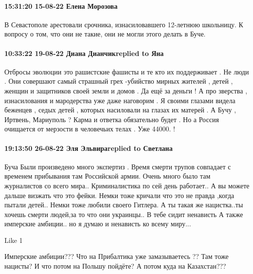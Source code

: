  
 
 
 
 

\paragraph{15:31:20 15-08-22 Елена Морозова}

В Севастополе арестовали срочника, изнасиловавшего 12-летнюю школьницу.
К вопросу о том, что они не такие, они не могли этого делать в Буче.

\paragraph{10:33:22 19-08-22 Диана Дианчикreplied to Яна}

Отбросы эволюции это рашистские фашисты и те кто их поддерживает . Не люди .
Они совершают самый страшный грех -убийство мирных жителей , детей , женщин и
защитников своей земли и домов . Да ещё за деньги ! А про зверства ,
изнасилования и мародерства уже даже наговорим . Я своими глазами видела
беженцев , седых детей , которых насиловали на глазах их матерей . А Бучу ,
Иртвень, Мариуполь ? Карма и ответка обязательно будет . Но а Россия очищается
от мерзости в человечьих телах . Уже 44000. !

\paragraph{19:13:50 26-08-22 Эля Эльвираreplied to Светлана}

Буча
Были произведено много экспертиз .
Время смерти трупов совпадает с временем прибывания там Российской армии.
Очень много было там журналистов со всего мира..
Криминалистика по сей день работает..
А вы можете дальше визжать что это фейки.
Немки тоже кричали что это не правда ,когда пытали детей..
Немки тоже любили своего Гитлера.
А ты такая же нацистка..ты хочешь смерти людей,за то что они украинцы..
В тебе сидит ненависть
А также имперские амбиции.. но я думаю и ненависть ко всему миру...

    Like 1

Имперские амбиции???
Что на Прибалтика уже замазываетесь ??
Там тоже нацисты?
И что потом на Польшу пойдёте?
А потом куда на Казахстан???

